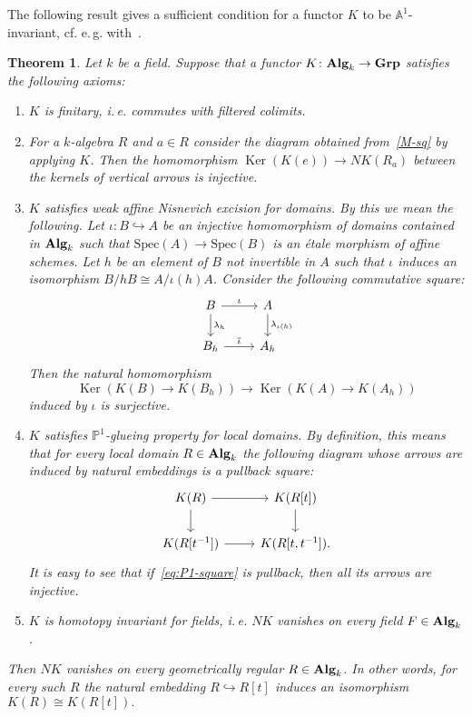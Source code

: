 \documentclass[oneside, 11pt]{amsart} \pdfoutput=1
\newcommand{\Ker}{\mathop{\mathrm{Ker}}\nolimits}
\numberwithin{equation}{section}
\newtheorem{theorem}[lemma]{Theorem}
\theoremstyle{definition}
\newcommand{\catname}[1]{{\normalfont\textbf{#1}}} %
\begin{document}
The following result gives a sufficient condition for a functor $K$ to be $\mathbb{A}^1$-invariant, cf. e.\,g. with~\cite[Proposition~2.2]{AHW20}.
\begin{theorem} \label{lpb}
 Let $k$ be a field.
 Suppose that a functor $K \colon \catname{Alg}_k \to \catname{Grp}$ satisfies the following axioms:
 \begin{enumerate}[label=\textnormal{(A\arabic*)}]
  \item \label{CFC} {\it $K$ is finitary}, i.\,e. commutes with filtered colimits.
  \item \label{DP} For a $k$-algebra $R$ and $a \in R$ consider the diagram obtained from~\eqref{M-sq} by applying $K$. Then the homomorphism $\Ker(K(e)) \to NK(R_a)$ between the kernels of vertical arrows is injective.
  \item \label{LPP} {\it $K$ satisfies weak affine Nisnevich excision for domains.} By this we mean the following. Let $\iota \colon B \hookrightarrow A$ be an injective homomorphism of domains contained in $\catname{Alg}_k$ such that $\mathrm{Spec}(A)\to\mathrm{Spec}(B)$ is an {\'e}tale morphism of affine schemes. Let $h$ be an element of $B$ not invertible in $A$ such that $\iota$ induces an isomorphism $B / hB \cong A / \iota(h)A$. Consider the following commutative square: \[\begin{tikzcd} B \ar{r}{\iota} \ar{d}{\lambda_h} & A \ar{d}{\lambda_{\iota(h)}}\\ B_h \ar{r}{\overline{\iota}} & A_h \end{tikzcd}\] Then the natural homomorphism \[\Ker(K(B) \to K(B_h)) \to \Ker(K(A) \to K(A_h))\] induced by $\iota$ is surjective.
  \item \label{PGP} {\it $K$ satisfies $\mathbb{P}^1$-glueing property for local domains.} By definition, this means that for every local domain $R \in \catname{Alg}_k$ the following diagram whose arrows are induced by natural embeddings is a pullback square: \begin{equation}\label{eq:P1-square} \begin{tikzcd} K(R) \ar[r] \ar[d] & K(R[t]) \arrow{d} \\ K(R[t^{-1}]) \ar{r} & K(R[t, t^{-1}]). \end{tikzcd} \end{equation}  
  It is easy to see that if~\eqref{eq:P1-square} is pullback, then all its arrows are injective.
  \item \label{HIF} {\it $K$ is homotopy invariant for fields}, i.\,e. $NK$ vanishes on every field $F \in \catname{Alg}_k$.
 \end{enumerate}
 Then $NK$ vanishes on every geometrically regular $R\in \catname{Alg}_k$. In other words, for every such $R$ the natural embedding $R \hookrightarrow R[t]$ induces an isomorphism $K(R)\cong K(R[t]).$
\end{theorem}
\end{document}

